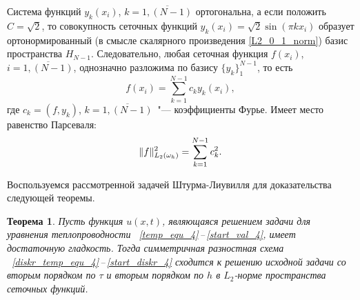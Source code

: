 \documentclass[11pt,a4paper,twoside,listtotoc,bibtotoc]{report}
\numberwithin{equation}{section}
\theoremstyle{definition}
\theoremstyle{plain}
\newtheorem*{theorem*}{Теорема}
\DeclarePairedDelimiter\norm{\lVert}{\rVert}
\begin{document}
Система функций $y_k(x_i)$, $k = \overline{1, (N-1)}$ ортогональна, а если положить
$C = \sqrt2$, то совокупность сеточных функций $y_k(x_i) = \sqrt2\sin(\pi kx_i)$
образует ортонормированный (в смысле скалярного произведения \eqref{L2_0_1_norm})
базис пространства $H_{N-1}$. Следовательно, любая сеточная функция $f(x_i)$,
$i=\overline{1, (N-1)}$, однозначно разложима по базису $\{y_k\}_1^{N-1}$,
то есть
%
$$
    f(x_i) = \sum\limits_{k=1}^{N-1}c_ky_k(x_i),
$$
%
где $c_k = (f, y_k)$, $k=\overline{1, (N-1)}$~"--- коэффициенты Фурье. Имеет место
равенство Парсеваля:
%
\begin{equation}
    \label{eq:Parsival-eq}
    \norm{f}^2_{L_2(\omega_h)} = \sum\limits_{k=1}^{N-1}c^2_k.
\end{equation}
%

Воспользуемся рассмотренной задачей Штурма-Лиувилля для доказательства
следующей теоремы.
%
\begin{theorem*}
%
    Пусть функция $u(x, t)$, являющаяся решением задачи для уравнения теплопроводности
   ~\eqref{temp_equ_4}\,--\,\eqref{start_val_4}, имеет достаточную гладкость.
   Тогда симметричная разностная схема
   ~\eqref{diskr_temp_equ_4}\,--\,\eqref{start_diskr_4} сходится к
    решению исходной задачи со вторым порядком по $\tau$ и
    вторым порядком по $h$ в $L_2$-норме пространства сеточных функций.
%
\end{theorem*}
%
\end{document}
